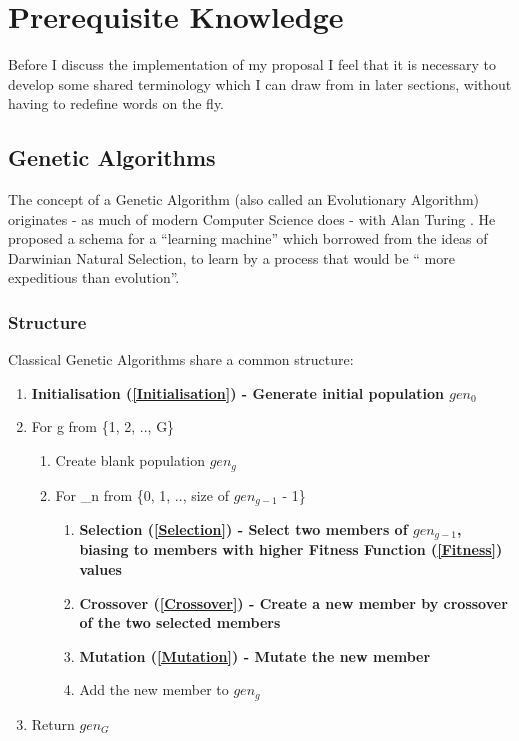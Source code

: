 \section{Prerequisite Knowledge}
Before I discuss the implementation of my proposal I feel that it is necessary to develop some shared terminology which I can draw from in later sections, without having to redefine words on the fly. 
\subsection{Genetic Algorithms}
The concept of a Genetic Algorithm (also called an Evolutionary Algorithm) originates - as much of modern Computer Science does - with Alan Turing \cite{turingImitation}. He proposed a schema for a ``learning machine'' which borrowed from the ideas of Darwinian Natural Selection, to learn by a process that would be `` more expeditious than evolution''.

\subsubsection{Structure} \label{Structure}
Classical Genetic Algorithms share a common structure:
\begin{enumerate}
    \item \bf Initialisation (\ref{Initialisation}) \rm - Generate initial population $gen_{0}$
    \item For g from \{1, 2, .., G\}
    \begin{enumerate}
        \item Create blank population $gen_{g}$
        \item For \_n from \{0, 1, .., size of $gen_{g-1}$ - 1\}
        \begin{enumerate}
            \item \bf Selection (\ref{Selection}) \rm - Select two members of $gen_{g-1}$, biasing to members with higher \bf Fitness Function (\ref{Fitness}) \rm values
            \item \bf Crossover (\ref{Crossover}) \rm - Create a new member by crossover of the two selected members
            \item \bf Mutation (\ref{Mutation}) \rm - Mutate the new member
            \item Add the new member to $gen_{g}$
        \end{enumerate}
    \end{enumerate}
    \item Return $gen_{G}$
\end{enumerate}

